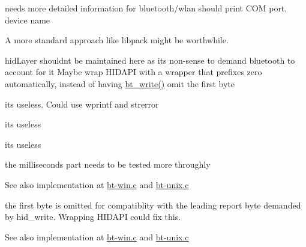 \begin{DoxyRefList}
\item[\label{bug__bug000010}%
\hypertarget{bug__bug000010}{}%
global\+Scope$>$ Global \hyperlink{info_8c_a65294a85b239c52e3d35726997374aa9}{info} (const char $\ast$arg)]needs more detailed information for bluetooth/wlan should print C\+O\+M port, device name  
\item[\label{bug__bug000011}%
\hypertarget{bug__bug000011}{}%
File \hyperlink{packets_8h}{packets.h} ]A more standard approach like libpack might be worthwhile.  
\item[\label{bug__bug000012}%
\hypertarget{bug__bug000012}{}%
global\+Scope$>$ Global \hyperlink{packets_8h_abe208177340b58cb5096daabe07922d1}{P\+R\+E\+F\+I\+X\+\_\+\+S\+I\+Z\+E} ]hid\+Layer shouldn\textquotesingle{}t be maintained here as it\textquotesingle{}s non-\/sense to demand bluetooth to account for it Maybe wrap H\+I\+D\+A\+P\+I with a wrapper that prefixes zero automatically, instead of having \hyperlink{bt-unix_8c_acbb62c11a110c097a4a9be010af9c4e7}{bt\+\_\+write()} omit the first byte  
\item[\label{bug__bug000013}%
\hypertarget{bug__bug000013}{}%
global\+Scope$>$ Global \hyperlink{tcp_8c_acb5191eb921dee0820de3cb6da0ec8e1}{tcp\+\_\+error} (void $\ast$fd\+\_\+)]it\textquotesingle{}s useless. Could use {\ttfamily wprintf} and {\ttfamily strerror}  
\item[\label{bug__bug000016}%
\hypertarget{bug__bug000016}{}%
global\+Scope$>$ Global \hyperlink{tcp_8h_a3893ee96ae73bdde565a655a8921ae9c}{tcp\+\_\+error} (void $\ast$device)]it\textquotesingle{}s useless  
\item[\label{bug__bug000017}%
\hypertarget{bug__bug000017}{}%
global\+Scope$>$ Global \hyperlink{tcp_8h_a0e21a1192bde43115c3763f02c51765b}{tcp\+\_\+info} (void $\ast$device)]it\textquotesingle{}s useless  
\item[\label{bug__bug000015}%
\hypertarget{bug__bug000015}{}%
global\+Scope$>$ Global \hyperlink{tcp_8h_a82118920bf919568655ec9b421f5d04e}{tcp\+\_\+read} )(void $\ast$device, u8 $\ast$buf, size\+\_\+t count, int milliseconds)]the milliseconds part needs to be tested more throughly \begin{DoxySeeAlso}{See also}
implementation at \hyperlink{bt-win_8c}{bt-\/win.\+c} and \hyperlink{bt-unix_8c}{bt-\/unix.\+c}  
\end{DoxySeeAlso}

\item[\label{bug__bug000014}%
\hypertarget{bug__bug000014}{}%
global\+Scope$>$ Global \hyperlink{tcp_8h_a5f7000a76dbf208a176f1b3b5ea9cebc}{tcp\+\_\+write} )(void $\ast$device, const u8 $\ast$buf, size\+\_\+t count)]the first byte is omitted for compatiblity with the leading report byte demanded by {\ttfamily hid\+\_\+write}. Wrapping H\+I\+D\+A\+P\+I could fix this. \begin{DoxySeeAlso}{See also}
implementation at \hyperlink{bt-win_8c}{bt-\/win.\+c} and \hyperlink{bt-unix_8c}{bt-\/unix.\+c}  
\end{DoxySeeAlso}


\end{DoxyRefList}
